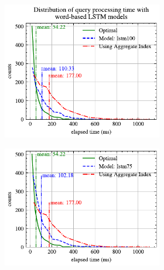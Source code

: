 \documentclass[conference]{IEEEtran}
\begin{document}
\begin{figure}[!th]
	\centering
	\begin{subfigure}{0.45\textwidth}
		\begin{subfigure}{\textwidth}
			\centering
%			
			\includegraphics[]{graphics/perf_dist_lstm100_B.pdf}
		\end{subfigure}
		\vfill
		\begin{subfigure}{\textwidth}
			\centering
			\includegraphics[]{graphics/perf_dist_lstm75_B.pdf}
		\end{subfigure}
		\vfill
		\begin{subfigure}{\textwidth}
			\centering

\end{subfigure}
\end{subfigure}
\end{figure}
\end{document}
